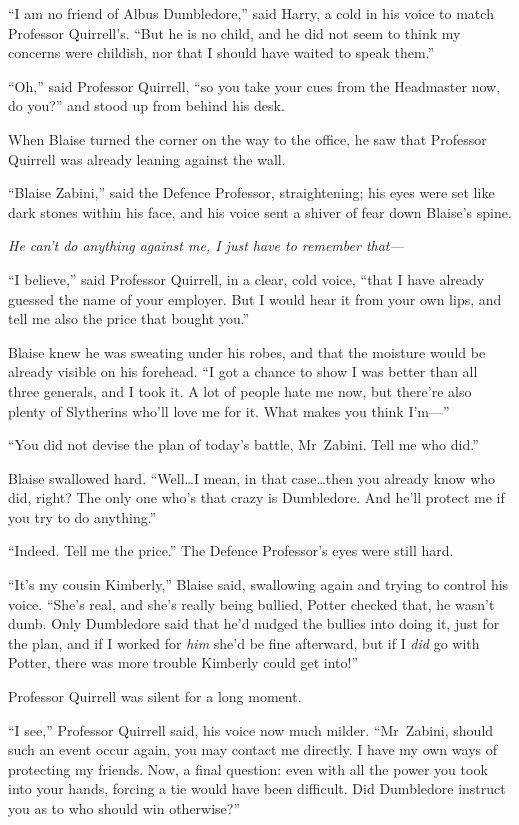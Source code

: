 “I am no friend of Albus Dumbledore,” said Harry, a cold in his voice to match Professor Quirrell’s. “But he is no child, and he did not seem to think my concerns were childish, nor that I should have waited to speak them.”

“Oh,” said Professor Quirrell, “so you take your cues from the Headmaster now, do you?” and stood up from behind his desk.

\later

When Blaise turned the corner on the way to the office, he saw that Professor Quirrell was already leaning against the wall.

“Blaise Zabini,” said the Defence Professor, straightening; his eyes were set like dark stones within his face, and his voice sent a shiver of fear down Blaise’s spine.

\emph{He can’t do anything against me, I just have to remember that—}

“I believe,” said Professor Quirrell, in a clear, cold voice, “that I have already guessed the name of your employer. But I would hear it from your own lips, and tell me also the price that bought you.”

Blaise knew he was sweating under his robes, and that the moisture would be already visible on his forehead. “I got a chance to show I was better than all three generals, and I took it. A lot of people hate me now, but there’re also plenty of Slytherins who’ll love me for it. What makes you think I’m—”

“You did not devise the plan of today’s battle, Mr~Zabini. Tell me who did.”

Blaise swallowed hard. “Well…I mean, in that case…then you
already know who did, right? The only one who’s that crazy is Dumbledore. And he’ll protect me if you try to do anything.”

“Indeed. Tell me the price.” The Defence Professor’s eyes were still hard.

“It’s my cousin Kimberly,” Blaise said, swallowing again and trying to control his voice. “She’s real, and she’s really being bullied, Potter checked that, he wasn’t dumb. Only Dumbledore said that he’d nudged the bullies into doing it, just for the plan, and if I worked for \emph{him} she’d be fine afterward, but if I \emph{did} go with Potter, there was more trouble Kimberly could get into!”

Professor Quirrell was silent for a long moment.

“I see,” Professor Quirrell said, his voice now much milder. “Mr~Zabini, should such an event occur again, you may contact me directly. I have my own ways of protecting my friends. Now, a final question: even with all the power you took into your hands, forcing a tie would have been difficult. Did Dumbledore instruct you as to who should win otherwise?”

